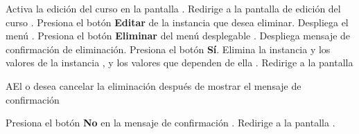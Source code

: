 \begin{UCtrayectoria}%
%

    \Actor Activa la edición del curso en la pantalla .
    \Sistema Redirige a la pantalla de edición del curso .
    \Actor Presiona el botón {\bf Editar} de la instancia que desea eliminar.
    \Sistema Despliega el menú .
    \Actor Presiona el botón {\bf Eliminar} del menú desplegable .
    \Sistema Despliega mensaje de confirmación de eliminación. 
    \Actor Presiona el botón {\bf Sí}. 
    \Sistema  Elimina la instancia y los valores de la instancia , y los valores que dependen de ella .
    \Sistema Redirige a la pantalla 

\end{UCtrayectoria}

\begin{UCtrayectoriaA}{A}{El  o  desea cancelar la eliminación después de mostrar el mensaje de confirmación}

  \Actor Presiona el botón {\bf No} en la mensaje de confirmación .
  \Sistema Redirige a la pantalla .

\end{UCtrayectoriaA}
